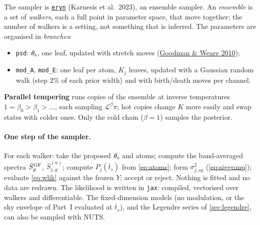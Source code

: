 \documentclass[11pt,a4paper]{article}
\begin{document}
The sampler is
\href{https://arxiv.org/abs/2303.02164}{\texttt{eryn}} (Karnesis et al.\ 2023), an
ensemble sampler. An \emph{ensemble} is a set of \emph{walkers}, each a full point in
parameter space, that move together; the number of walkers is a setting, not something
that is inferred. The parameters are organised in \emph{branches}:
\begin{itemize}
  \item \texttt{psd}: $\theta_{\rm s}$, one leaf, updated with stretch moves
        (\href{https://doi.org/10.2140/camcos.2010.5.65}{Goodman \& Weare 2010});
  \item \texttt{mod\_A}, \texttt{mod\_E}: one leaf per atom, $K_j$ leaves, updated
        with a Gaussian random walk (step 2\% of each prior width) and with
        birth/death moves per channel.
\end{itemize}
\textbf{Parallel tempering} runs copies of the ensemble at inverse temperatures
$1=\beta_0>\beta_1>\dots$, each sampling $\mathcal L^\beta\pi$; hot copies change $K$
more easily and swap states with colder ones. Only the cold chain ($\beta=1$) samples
the posterior.

\paragraph{One step of the sampler.} For each walker: take the proposed
$\theta_{\rm s}$ and atoms; compute the band-averaged spectra $\bar S^{\rm GF}_g$,
$\bar S^{(n)}_{j,g}$; compute $P_j(\bar t_s)$ from \cref{eq:atoms}; form
$\sigma^2_{j,sg}$ (\cref{eq:siggroup}); evaluate \cref{eq:wlik} against the frozen
$Y$; accept or reject. Nothing is fitted and no data are redrawn. The likelihood is
written in \texttt{jax}: compiled, vectorised over walkers and differentiable. The
fixed-dimension models (no modulation, or the sky envelope of Part~I evaluated at
$\bar t_s$), and the Legendre series of \cref{sec:legendre}, can also be sampled
with NUTS.
\end{document}
